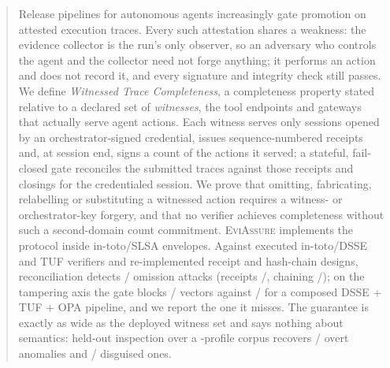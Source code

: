\documentclass[letterpaper,10pt,twocolumn]{article}
\theoremstyle{definition}
\begin{document}
\begin{abstract}
Release pipelines for autonomous agents increasingly gate promotion on attested execution traces. Every such attestation shares a weakness: the evidence collector is the run's only observer, so an adversary who controls the agent and the collector need not forge anything; it performs an action and does not record it, and every signature and integrity check still passes. We define \emph{Witnessed Trace Completeness}, a completeness property stated relative to a declared set of \emph{witnesses}, the tool endpoints and gateways that actually serve agent actions. Each witness serves only sessions opened by an orchestrator-signed credential, issues sequence-numbered receipts and, at session end, signs a count of the actions it served; a stateful, fail-closed gate reconciles the submitted traces against those receipts and closings for the credentialed session. We prove that omitting, fabricating, relabelling or substituting a witnessed action requires a witness- or orchestrator-key forgery, and that no verifier achieves completeness without such a second-domain count commitment. \textsc{EviAssure} implements the protocol inside in-toto/SLSA envelopes. Against executed in-toto/DSSE and TUF verifiers and re-implemented receipt and hash-chain designs, reconciliation detects \omWtc/\omVectors{} omission attacks (receipts \omReceipts/\omVectors, chaining \omChain/\omVectors); on the tampering axis the gate blocks \eviBlocked/\eviTotal{} vectors against \compBlocked/\compTotal{} for a composed DSSE + TUF + OPA pipeline, and we report the one it misses. The guarantee is exactly as wide as the deployed witness set and says nothing about semantics: held-out inspection over a \corpusProfiles{}-profile corpus recovers \insOvertK/\insOvertN{} overt anomalies and \insStealthK/\insStealthN{} disguised ones.
\end{abstract}
\end{document}
